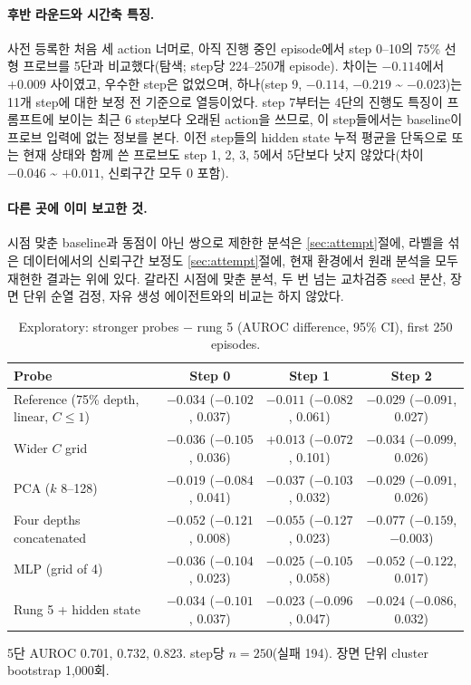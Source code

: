 \documentclass[11pt]{article}
\begin{document}
\paragraph{후반 라운드와 시간축 특징.} 사전 등록한 처음 세 action 너머로, 아직 진행 중인 episode에서 step 0--10의 75\% 선형 프로브를 5단과 비교했다(탐색; step당 224--250개 episode).
차이는 $-0.114$에서 $+0.009$ 사이였고, 우수한 step은 없었으며, 하나(step 9, $-0.114$, $-0.219$ \textasciitilde{} $-0.023$)는 11개 step에 대한 보정 전 기준으로 열등이었다. step 7부터는 4단의 진행도 특징이 프롬프트에 보이는 최근 6 step보다 오래된 action을 쓰므로, 이 step들에서는 baseline이 프로브 입력에 없는 정보를 본다.
이전 step들의 hidden state 누적 평균을 단독으로 또는 현재 상태와 함께 쓴 프로브도 step 1, 2, 3, 5에서 5단보다 낫지 않았다(차이 $-0.046$ \textasciitilde{} $+0.011$, 신뢰구간 모두 0 포함).

\paragraph{다른 곳에 이미 보고한 것.} 시점 맞춘 baseline과 동점이 아닌 쌍으로 제한한 분석은 \ref{sec:attempt}절에, 라벨을 섞은 데이터에서의 신뢰구간 보정도 \ref{sec:attempt}절에, 현재 환경에서 원래 분석을 모두 재현한 결과는 위에 있다.
갈라진 시점에 맞춘 분석, 두 번 넘는 교차검증 seed 분산, 장면 단위 순열 검정, 자유 생성 에이전트와의 비교는 하지 않았다.

\begin{table}[t]
\centering\small
\caption{Exploratory: stronger probes $-$ rung 5 (AUROC difference, 95\% CI), first 250 episodes.}\label{tab:strength}
\begin{tabularx}{\linewidth}{@{}Lccc@{}}
\toprule
Probe & Step 0 & Step 1 & Step 2 \\
\midrule
Reference (75\% depth, linear, $C \le 1$) & $-0.034$ ($-0.102$, 0.037) & $-0.011$ ($-0.082$, 0.061) & $-0.029$ ($-0.091$, 0.027) \\
Wider $C$ grid & $-0.036$ ($-0.105$, 0.036) & $+0.013$ ($-0.072$, 0.101) & $-0.034$ ($-0.099$, 0.026) \\
PCA ($k$ 8--128) & $-0.019$ ($-0.084$, 0.041) & $-0.037$ ($-0.103$, 0.032) & $-0.029$ ($-0.091$, 0.026) \\
Four depths concatenated & $-0.052$ ($-0.121$, 0.008) & $-0.055$ ($-0.127$, 0.023) & $-0.077$ ($-0.159$, $-0.003$) \\
MLP (grid of 4) & $-0.036$ ($-0.104$, 0.023) & $-0.025$ ($-0.105$, 0.058) & $-0.052$ ($-0.122$, 0.017) \\
Rung 5 + hidden state & $-0.034$ ($-0.101$, 0.037) & $-0.023$ ($-0.096$, 0.047) & $-0.024$ ($-0.086$, 0.032) \\
\bottomrule
\end{tabularx}
\par\smallskip\raggedright\footnotesize
5단 AUROC 0.701, 0.732, 0.823. step당 $n = 250$(실패 194). 장면 단위 cluster bootstrap 1,000회.
\end{table}
\end{document}
